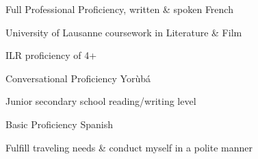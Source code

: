

\begin{cventries}

  \cventry
    {Full Professional Proficiency, written \& spoken} %
    {French} %
    {} %
    {} %
    {
      \begin{cvitems} %
        \item {University of Lausanne coursework in Literature \& Film}
        \item {ILR proficiency of 4+}
      \end{cvitems}
    }

  \cventry
    {Conversational Proficiency} %
    {Yor{\`u}b{\'a}} %
    {} %
    {} %
    {
      \begin{cvitems} %
        \item {Junior secondary school reading/writing level}
      \end{cvitems}
	}
	
  \cventry
    {Basic Proficiency} %
    {Spanish} %
    {} %
    {} %
    {
      \begin{cvitems} %
        \item {Fulfill traveling needs \& conduct myself in a polite manner}
      \end{cvitems}
	}

\end{cventries}
